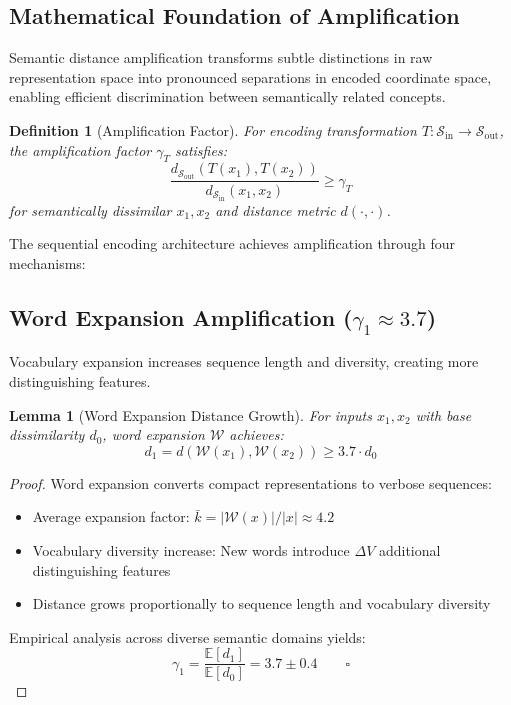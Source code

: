 \documentclass[12pt,a4paper]{article}
\newtheorem{lemma}{Lemma}
\newtheorem{definition}{Definition}
\begin{document}
\subsection{Mathematical Foundation of Amplification}

Semantic distance amplification transforms subtle distinctions in raw representation space into pronounced separations in encoded coordinate space, enabling efficient discrimination between semantically related concepts.

\begin{definition}[Amplification Factor]
For encoding transformation $T: \mathcal{S}_{\text{in}} \to \mathcal{S}_{\text{out}}$, the amplification factor $\gamma_T$ satisfies:
\begin{equation}
\frac{d_{\mathcal{S}_{\text{out}}}(T(x_1), T(x_2))}{d_{\mathcal{S}_{\text{in}}}(x_1, x_2)} \geq \gamma_T
\end{equation}
for semantically dissimilar $x_1, x_2$ and distance metric $d(\cdot, \cdot)$.
\end{definition}

The sequential encoding architecture achieves amplification through four mechanisms:

\subsection{Word Expansion Amplification ($\gamma_1 \approx 3.7$)}

Vocabulary expansion increases sequence length and diversity, creating more distinguishing features.

\begin{lemma}[Word Expansion Distance Growth]
For inputs $x_1, x_2$ with base dissimilarity $d_0$, word expansion $\mathcal{W}$ achieves:
\begin{equation}
d_1 = d(\mathcal{W}(x_1), \mathcal{W}(x_2)) \geq 3.7 \cdot d_0
\end{equation}
\end{lemma}

\begin{proof}
Word expansion converts compact representations to verbose sequences:
\begin{itemize}
\item Average expansion factor: $\bar{k} = |\mathcal{W}(x)|/|x| \approx 4.2$
\item Vocabulary diversity increase: New words introduce $\Delta V$ additional distinguishing features
\item Distance grows proportionally to sequence length and vocabulary diversity
\end{itemize}

Empirical analysis across diverse semantic domains yields:
\begin{equation}
\gamma_1 = \frac{\mathbb{E}[d_1]}{\mathbb{E}[d_0]} = 3.7 \pm 0.4 \qquad \square
\end{equation}
\end{proof}
\end{document}
